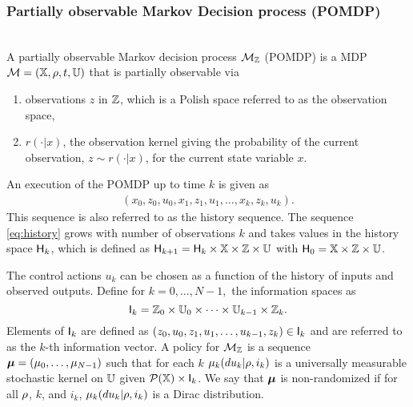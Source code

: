 \documentclass{ifacconf}
\begin{document}
\subsubsection{Partially observable Markov Decision process (POMDP)}\label{sec:POMDP}
\begin{definition} \label{def:MDP}\mbox{ }\\
A partially observable Markov decision process $\mathcal{M}_{{\mathbb{Z}}}$ (POMDP) is a MDP $\mathcal{M} = ({\mathbb{X}}, \rho, t, {\mathbb{U}})$  that is partially observable via  
\begin{enumerate}
	\item observations $z$ in ${\mathbb{Z}}$,  which is a Polish space referred to as the observation space, %
\item $r(\cdot|x)$,  the observation kernel giving the probability of the current observation,  $z\sim r(\cdot|x)$,  for the current state variable $x$.
\end{enumerate}


\end{definition} 

An execution of the POMDP  up to time $k$ is given as
\begin{align}\label{eq:history} (x_0,z_0,u_0,x_1,z_1,u_1,\ldots,x_k,z_k,u_k).\end{align}
This sequence is also referred to as the history sequence.
The sequence  \eqref{eq:history} grows with number of observations  $k$ and takes values in the history space ${\mathsf{H}}_k$, which is defined as
  ${\mathsf{H}}_{k+1}={\mathsf{H}}_{k}\times{\mathbb{X}}\times{\mathbb{Z}}\times {\mathbb{U}}$ with ${\mathsf{H}}_0={\mathbb{X}}\times{\mathbb{Z}}\times {\mathbb{U}}$.


The control actions $u_k$ can be chosen as a function of the history of inputs and observed outputs.  
Define for $k=0,\ldots,N-1,$ the information spaces as
\[{\mathsf{I}}_k={\mathbb{Z}}_0\times{\mathbb{U}}_0\times\dots\times{\mathbb{U}}_{k-1}\times{\mathbb{Z}}_k.\]
Elements of ${\mathsf{I}}_k$ are defined as $(z_0,u_0,z_1,u_1,\ldots,u_{k-1},z_k)\in{\mathsf{I}}_k$ and are referred to as the $k$-th information vector. 
	A policy for $\mathcal{M}_{{\mathbb{Z}}}$ is a sequence ${\boldsymbol{\mu}}=({\mu}_0,\ldots,{\mu}_{N-1})$ such that for each $k$ ${\mu}_k(du_k|\rho, i_k)$ is a universally measurable stochastic kernel on ${\mathbb{U}}$  given $\mathcal{P}({\mathbb{X}})\times {\mathsf{I}}_k$.
	We say that ${\boldsymbol{\mu}}$ is non-randomized if for all $\rho$, $k$, and $i_k$,    ${\mu}_k(du_k|\rho, i_k)$ is a Dirac distribution.
\end{document}
